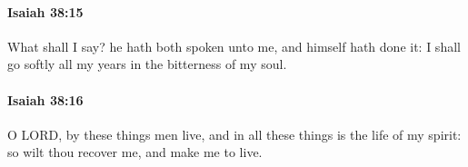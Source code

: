 		\paragraph{Isaiah 38:15} %
			\label{ISAIAH-38-15}

			What shall I say? he hath both spoken unto me, and himself hath done it: I shall go softly all my years in the bitterness of my soul.


		\paragraph{Isaiah 38:16} %
			\label{ISAIAH-38-16}

			O LORD, by these things men live, and in all these things is the life of my spirit: so wilt thou recover me, and make me to live.


